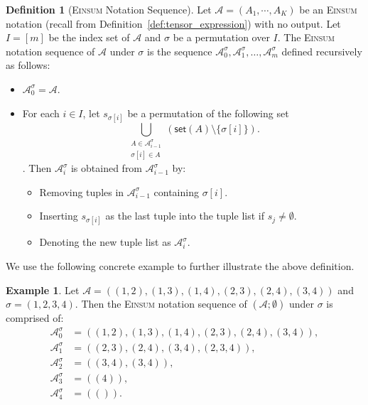 \documentclass[12pt]{article}
\theoremstyle{plain}
\theoremstyle{definition}
\newtheorem{definition}{Definition}
\newtheorem{example}{Example}
\def\Einsum{\textsc{Einsum}}
\newcommand{\takesetp}[1]{\mathsf{set}(#1)}
\newcommand{\taketuplep}[1]{\mathsf{tuple}\left( #1 \right)}
\def\calA{\mathcal{A}}
\begin{document}
\begin{bibunit}[agsm]
\begin{definition}[\Einsum{} Notation Sequence]
\label{def:einsum_sequence}
Let $\calA = (A_1, \cdots, A_K)$ be an \Einsum{} notation (recall from Definition~\ref{def:tensor_expression}) with no output. Let $I = [m]$ be the index set of $\calA$ and $\sigma$ be a permutation over $I$. The \Einsum{} notation sequence of $\calA$ under $\sigma$ is the sequence $\calA^{\sigma}_0, \calA^{\sigma}_1, \ldots, \calA^{\sigma}_m$ defined recursively as follows:
\begin{itemize}
\item $\calA^{\sigma}_0 = \calA$.
\item For each $i \in I$, let $s_{\sigma[i]}$ be a permutation of the following set 
\begin{equation*}
    \bigcup_{\substack{ A \in \calA^{\sigma}_{i-1} \\ \sigma[i] \in A}} (\takesetp{A} \setminus \{\sigma[i]\}).
\end{equation*}. 
Then $\calA^{\sigma}_i$ is obtained from $\calA^{\sigma}_{i-1}$ by:
\begin{itemize}
\item Removing tuples in $\calA_{i - 1}^{\sigma}$ containing $\sigma[i]$.
\item Inserting $s_{\sigma[i]}$ as the last tuple into the tuple list if $s_j \ne \emptyset$.
\item Denoting the new tuple list as $\calA^{\sigma}_{i}$.
\end{itemize}
\end{itemize}
\end{definition}

We use the following concrete example to further illustrate the above definition. 

\begin{example}
Let $\calA = ((1,2), (1,3), (1,4), (2,3), (2,4), (3,4))$ and $\sigma = (1,2,3,4)$. Then the \Einsum{} notation sequence of $(\calA; \emptyset)$ under $\sigma$ is comprised of:
\begin{align*}
\calA^{\sigma}_{0} & = ((1,2), (1,3), (1,4), (2,3), (2,4), (3,4)), \\
\calA^{\sigma}_{1} & = ((2,3), (2,4), (3,4),(2,3,4)), \\
\calA^{\sigma}_{2} & = ((3,4), (3,4)), \\
\calA^{\sigma}_{3} & = ((4)), \\
\calA^{\sigma}_{4} & = (()).
\end{align*}
\end{example}


\end{bibunit}
\end{document}
